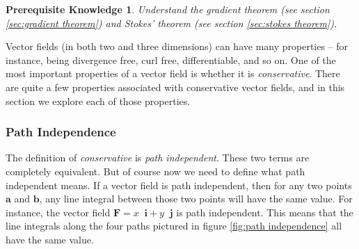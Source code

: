 \documentclass{myarticle}
\renewcommand{\vec}[1]{\mathbf{#1}}
\newcommand{\unitvector}[1]{
  \mathop{}\!\vec{#1}
}
\newcommand{\ih}{\unitvector{i}}
\newcommand{\jh}{\unitvector{j}}
\theoremstyle{nospace}
\newtheorem*{oldprereq}{Prerequisite Knowledge}
\newenvironment{prereq}
{\begin{mdframed}\begin{oldprereq}}
    {\end{oldprereq}\end{mdframed}}
\newtheorem{old series theorem}{Theorem}
\newenvironment{series theorem}
{\begin{mdframed}\begin{old series theorem}}
    {\end{old series theorem}\end{mdframed}}
\begin{document}
\begin{prereq}
  Understand the gradient theorem (see section \ref{sec:gradient
    theorem}) and Stokes' theorem (see section \ref{sec:stokes
    theorem}).
\end{prereq}

Vector fields (in both two and three dimensions) can have many
properties -- for instance, being divergence free, curl free,
differentiable, and so on. One of the most important properties of a
vector field is whether it is \textit{conservative}. There are quite a
few properties associated with conservative vector fields, and in this
section we explore each of those properties.

\subsubsection{Path Independence}
\label{sec:path independence}

The definition of \textit{conservative} is \textit{path independent}.
These two terms are completely equivalent. But of course now we need
to define what path independent means. If a vector field is path
independent, then for any two points $\vec{a}$ and $\vec{b}$, any line
integral between those two points will have the same value. For
instance, the vector field $\vec{F} = x \ih + y \jh$ is path
independent. This means that the line integrals along the four paths
pictured in figure \ref{fig:path independence} all have the same
value.
\end{document}
